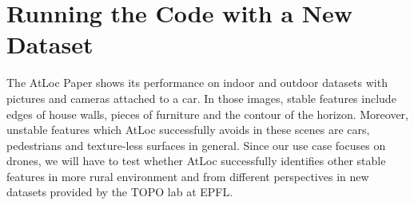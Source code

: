 \documentclass[10pt,conference,compsocconf]{IEEEtran}
\begin{document}




\section{Running the Code with a New Dataset}

The AtLoc Paper shows its performance on indoor and outdoor datasets with pictures and cameras attached to a car. In those images, stable features include edges of house walls, pieces of furniture and the contour of the horizon. Moreover, unstable features which AtLoc successfully avoids in these scenes are cars, pedestrians and texture-less surfaces in general. Since our use case focuses on drones, we will have to test whether AtLoc successfully identifies other stable features in more rural environment and from different perspectives in new datasets provided by the TOPO lab at EPFL.
\end{document}
